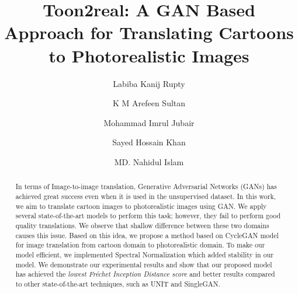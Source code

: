 \documentclass[runningheads]{llncs}
\begin{document}
%
\title{Toon2real: A GAN Based Approach for Translating Cartoons to Photorealistic Images}
%
%
\author{Labiba Kanij Rupty 
\and K M Arefeen Sultan 
\and Mohammad Imrul Jubair 
\and Sayed Hossain Khan
\and MD. Nahidul Islam
} 
%
%
%
\maketitle              %
%
\begin{abstract}
In terms of Image-to-image translation, Generative Adversarial Networks (GANs) has achieved great success even when it is used in the unsupervised dataset. In this work, we aim to translate cartoon images to photorealistic images using GAN.
We apply several state-of-the-art models to perform this task; however, they fail to perform good quality translations.
We observe that shallow difference between these two domains causes this issue. Based on this idea, we propose a method based on CycleGAN model for image translation from cartoon domain to photorealistic domain. To make our model efficient, we implemented Spectral Normalization which added stability in our model. We demonstrate our experimental results and show that our proposed model has achieved the \textit{lowest Fr\'echet Inception Distance score} and better results compared to other state-of-the-art techniques, such as UNIT and SingleGAN.

\end{abstract}
%
%
%
\end{document}
